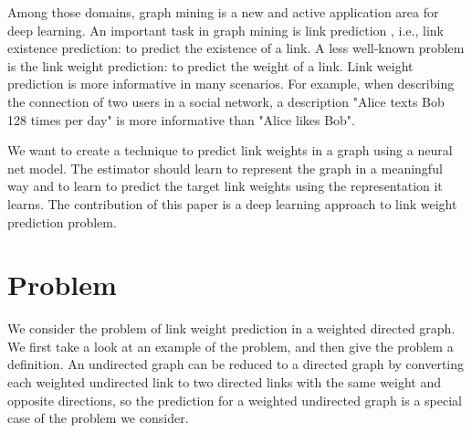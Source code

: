 \documentclass[conference]{IEEEtran}
\begin{document}
Among those domains,
graph mining is a new and active application area for deep learning.
An important task in graph mining is link prediction \cite{liben2007link} 
\cite{al2006link}, i.e., link existence prediction:
to predict the existence of a link.
A less well-known problem is the link weight prediction: to predict the weight of a link.
Link weight prediction is more informative in many scenarios.
For example, when describing the connection of two users in a social network,
a description "Alice texts Bob 128 times per day" is more informative than
"Alice likes Bob".

We want to create a technique to predict link weights in a graph using a 
neural net model.
The estimator should learn to represent the graph in a meaningful way and to 
learn to predict the target link weights using the representation it learns.
The contribution of this paper is
a deep learning approach to link weight prediction problem.

\section{Problem}
We consider the problem of link weight prediction in a weighted directed graph.
We first take a look at an example of the problem,
and then give the problem a definition.
An undirected graph can be reduced to a directed graph by converting each weighted undirected link to two directed links with the same weight and opposite directions,
so the prediction for a weighted undirected graph is a special case of the problem we consider.
\end{document}
